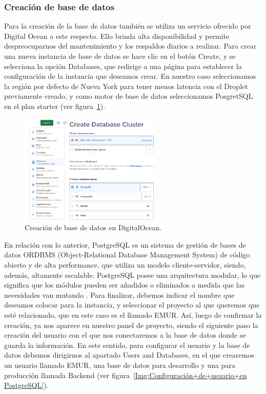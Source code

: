 \subsubsection{Creación de base de datos}
Para la creación de la base de datos también se utiliza un servicio ofrecido por Digital Ocean a este respecto. Ello brinda alta disponibilidad y permite despreocuparnos del mantenimiento y los respaldos diarios a realizar.
Para crear una nueva instancia de base de datos se hace clic en el botón Create, y se selecciona la opción Databases, que redirige a una página para establecer la configuración de la instancia que deseamos crear. En nuestro caso seleccionamos la región por defecto de Nueva York para tener menos latencia con el Droplet previamente creado, y como motor de base de datos seleccionamos PosgretSQL en el plan starter (ver figura~\ref{Img:Creación+de+base+de+datos en+DigitalOcean}).
\begin{figure}[h]
    \centering
    \includegraphics[width=0.6\textwidth]{img/infraestructura/crear-base-de-datos.png}
    \caption{Creación de base de datos en DigitalOcean.} \label{Img:Creación+de+base+de+datos en+DigitalOcean}
\end{figure} 


En relación con lo anterior, PostgreSQL es un sistema de gestión de bases de datos ORDBMS (Object-Relational Database Management System) de código abierto y de alta performance, que utiliza un modelo cliente-servidor, siendo, además, altamente escalable. PostgreSQL posee una arquitectura modular, lo que significa que los módulos pueden ser añadidos o eliminados a medida que las necesidades van mutando \cite{web:postgresql}.
Para finalizar, debemos indicar el nombre que deseamos colocar para la instancia, y seleccionar el proyecto al que queremos que esté relacionado, que en este caso es el llamado EMUR. Así, luego de confirmar la creación, ya nos aparece en nuestro panel de proyecto, siendo el siguiente paso la creación del usuario con el que nos conectaremos a la base de datos donde se guarda la información. 
En este sentido, para configurar el usuario y la base de datos debemos dirigirnos al apartado Users and Databases, en el que crearemos un usuario llamado EMUR, una base de datos para desarrollo y una para producción llamada Backend (ver figura~\ref{Img:Configuración+de+usuario+en PostgreSQL}).

